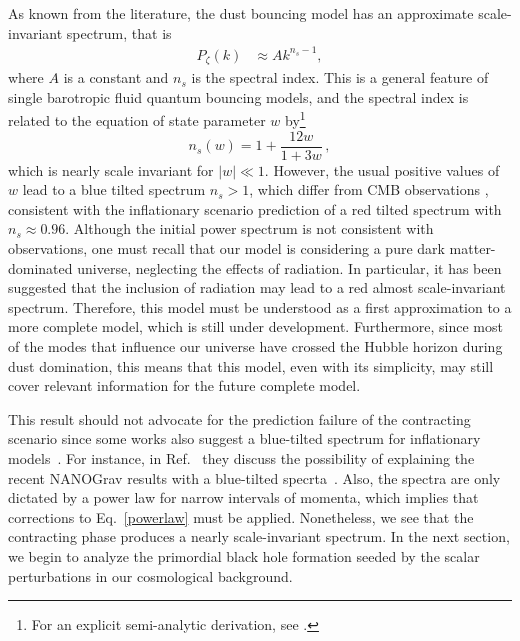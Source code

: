 \documentclass[a4paper,11pt]{article}
\begin{document}
As known from the literature, the dust bouncing model has an approximate scale-invariant spectrum, that is
\begin{align}
	\label{powerlaw}
	P_{{\zeta}}(k) & \approx A k^{n_s-1}
	,\end{align}
where $A$ is a constant and $n_s$ is the spectral index. This is a general feature of single barotropic fluid quantum bouncing models, and the spectral index is related to the equation of state parameter $w$ by\footnote{For an explicit semi-analytic derivation, see \cite{nelson_peter_bouncing_original}.}
%
\begin{equation}
	n_{s}(w) = 1 + \frac{ 12w }{ 1 + 3w }\, ,
\end{equation}
%
which is nearly scale invariant for $|w| \ll 1 $. However, the usual positive values of $w$ lead to a blue tilted spectrum $n_{s} > 1$, which differ from CMB observations \cite{planck_inflation_constraints}, consistent with the inflationary scenario prediction of a red tilted spectrum with $n_{s} \approx 0.96$. Although the initial power spectrum is not consistent with observations, one must recall that our model is considering a pure dark matter-dominated universe, neglecting the effects of radiation. In particular, it has been suggested \cite{nelson2021bouncing} that the inclusion of radiation may lead to a red almost scale-invariant spectrum. Therefore, this model must be understood as a first approximation to a more complete model, which is still under development. Furthermore, since most of the modes that influence our universe have crossed the Hubble horizon during dust domination, this means that this model, even with its simplicity, may still cover relevant information for the future complete model.

This result should not advocate for the prediction failure of the contracting scenario
since some works also suggest a blue-tilted spectrum for inflationary
models~\cite{Wang2014, Cai2015}. For instance, in Ref.~\cite{Kuroyanagi2021} they
discuss the possibility of explaining the recent NANOGrav results with a blue-tilted
specrta~\cite{Wu2023}. Also, the spectra are only dictated by a power law for narrow
intervals of momenta, which implies that corrections to Eq.~\eqref{powerlaw} must be
applied. Nonetheless, we see that the contracting phase produces a nearly
scale-invariant spectrum. In the next section, we begin to analyze the primordial black
hole formation seeded by the scalar perturbations in our cosmological background.
\end{document}
